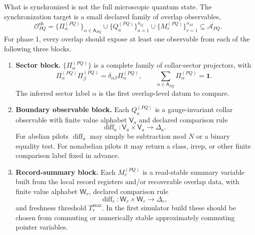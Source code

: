 \documentclass[11pt]{article}
\begin{document}
What is synchronized is not the full microscopic quantum state. The synchronization target is a
small declared family of overlap observables,
\begin{equation}
\mathcal O^{\mathrm{sh}}_{PQ}
=
\{\Pi_{\alpha}^{(PQ)}\}_{\alpha\in\mathsf A_{PQ}}
\cup
\{Q_a^{(PQ)}\}_{a=1}^{n_Q}
\cup
\{M_r^{(PQ)}\}_{r=1}^{n_M}
\subseteq
\mathcal A_{PQ}.
\end{equation}
For phase 1, every overlap should expose at least one observable from each of the following
three blocks.
\begin{enumerate}[leftmargin=2em]
\item \textbf{Sector block.}
$\{\Pi_{\alpha}^{(PQ)}\}$ is a complete family of collar-sector projectors, with
\begin{equation}
\Pi_{\alpha}^{(PQ)}\Pi_{\beta}^{(PQ)}=\delta_{\alpha\beta}\Pi_{\alpha}^{(PQ)},
\qquad
\sum_{\alpha\in\mathsf A_{PQ}}\Pi_{\alpha}^{(PQ)}=\mathbf 1.
\end{equation}
The inferred sector label $\alpha$ is the first overlap-level datum to compare.
\item \textbf{Boundary observable block.}
Each $Q_a^{(PQ)}$ is a gauge-invariant collar observable with finite value alphabet
$\mathsf V_a$ and declared comparison rule
\begin{equation}
\operatorname{diff}_a:\mathsf V_a\times \mathsf V_a\to \Delta_a.
\end{equation}
For abelian pilots $\operatorname{diff}_a$ may simply be subtraction mod $N$ or a binary
equality test. For nonabelian pilots it may return a class, irrep, or other finite comparison
label fixed in advance.
\item \textbf{Record-summary block.}
Each $M_r^{(PQ)}$ is a read-stable summary variable built from the local record registers and/or
recoverable overlap data, with finite value alphabet $\mathsf W_r$, declared comparison rule
\begin{equation}
\operatorname{diff}_r:\mathsf W_r\times \mathsf W_r\to \Delta_r,
\end{equation}
and freshness threshold $T_r^{\max}$. In the first simulator build these should be chosen from
commuting or numerically stable approximately commuting pointer variables.
\end{enumerate}
\end{document}

